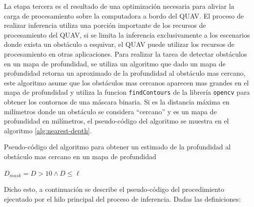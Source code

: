 La etapa tercera es el resultado de una optimización necesaria para aliviar la carga de procesamiento sobre la computadora a bordo del QUAV. El proceso de realizar inferencia utiliza una porción importante de los recursos de procesamiento del QUAV, si se limita la inferencia exclusivamente a los escenarios donde exista un obstáculo a esquivar, el QUAV puede utilizar los recursos de procesamiento en otras aplicaciones. Para realizar la tarea de detectar obstáculos en un mapa de profundidad, se utiliza un algoritmo que dado un mapa de profundidad retorna un aproximado de la profundidad al obstáculo mas cercano, este algoritmo asume que los obstáculos mas cercanos aparecen mas grandes en el mapa de profundidad y utiliza la funcion \texttt{findContours} de la librería \texttt{opencv} \cite{bradski2000opencv} para obtener los contornos de una máscara binaria. Si \jim{\ell} es la distancia máxima en milímetros donde un obstáculo se considera ``cercano'' y  es un mapa de profundidad en milímetros, el pseudo-código del algoritmo se muestra en el algoritmo \ref{alg:nearest-depth}.

\begin{algorithm}
\caption{Pseudo-código del algoritmo para obtener un estimado de la profundidad al obstáculo mas cercano en un mapa de profundidad }
\label{alg:nearest-depth}

$D_{mask} = D > 10 \wedge D \leq \ell$


\Return{\jim{\infty}}

\end{algorithm}

Dicho esto, a continuación se describe el pseudo-código del procedimiento ejecutado por el hilo principal del proceso de inferencia. Dadas las definiciones:

